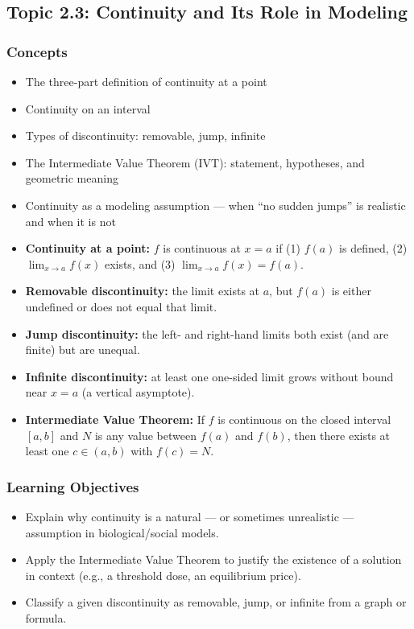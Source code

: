 \documentclass[11pt]{article}
\begin{document}
\subsection{Topic 2.3: Continuity and Its Role in Modeling}

\subsubsection*{Concepts}
\begin{itemize}[leftmargin=*]
  \item The three-part definition of continuity at a point
  \item Continuity on an interval
  \item Types of discontinuity: removable, jump, infinite
  \item The Intermediate Value Theorem (IVT): statement, hypotheses, and geometric meaning
  \item Continuity as a modeling assumption --- when ``no sudden jumps'' is realistic and when it is not
\end{itemize}

\begin{keydefbox}
\begin{itemize}[leftmargin=*]
  \item \textbf{Continuity at a point:} $f$ is continuous at $x=a$ if (1) $f(a)$ is defined, (2) $\displaystyle\lim_{x\to a}f(x)$ exists, and (3) $\displaystyle\lim_{x\to a}f(x)=f(a)$.
  \item \textbf{Removable discontinuity:} the limit exists at $a$, but $f(a)$ is either undefined or does not equal that limit.
  \item \textbf{Jump discontinuity:} the left- and right-hand limits both exist (and are finite) but are unequal.
  \item \textbf{Infinite discontinuity:} at least one one-sided limit grows without bound near $x=a$ (a vertical asymptote).
  \item \textbf{Intermediate Value Theorem:} If $f$ is continuous on the closed interval $[a,b]$ and $N$ is any value between $f(a)$ and $f(b)$, then there exists at least one $c\in(a,b)$ with $f(c)=N$.
\end{itemize}
\end{keydefbox}

\subsubsection*{Learning Objectives}
\begin{itemize}[leftmargin=*]
  \item Explain why continuity is a natural --- or sometimes unrealistic --- assumption in biological/social models.
  \item Apply the Intermediate Value Theorem to justify the existence of a solution in context (e.g., a threshold dose, an equilibrium price).
  \item Classify a given discontinuity as removable, jump, or infinite from a graph or formula.
\end{itemize}
\end{document}

